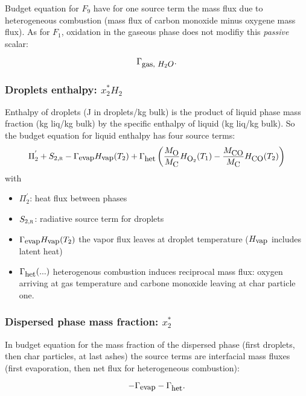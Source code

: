  Budget equation for $F_{9}$ have for one source term the mass flux due to
 heterogeneous combustion (mass flux of carbon monoxide minus oxygene mass
 flux). As for $F_{1}$, oxidation in the gaseous phase does not modifiy this
 {\em passive} scalar:

\begin{equation}
   \Gamma_{\mbox{\small gas, $H_{2}O$}}.
\end{equation}





\subsubsection{Droplets enthalpy: $x_{2}^{*}H_{2}$ }

Enthalpy of droplets (J in droplets/kg bulk) is the product of liquid phase mass
fraction (kg liq/kg bulk) by the specific enthalpy of liquid (kg liq/kg
bulk). So the budget equation for liquid enthalpy has four source terms:
\begin{equation}
     \Pi_{2}^{'}+S_{2,\mbox{\scriptsize\textsc{r}}}-\Gamma_{\mbox{\small evap}}H_{\mbox{\small vap}}(T_{2})
                        +\Gamma_{\mbox{\small het}}\left( \dfrac{M_{\mbox{\small O}}}{M_{\mbox{\small C}}}H_{\mbox{\small O}_{2}}(T_{1})
                                      -\dfrac{M_{\mbox{\small CO}   }}{M_{\mbox{\small C}}}H_{\mbox{\small CO}   }(T_{2})\right)
\end{equation}
with
\begin{itemize}
\item $\Pi_{2}^{'}$: heat flux between phases
\item $S_{2,\mbox{\scriptsize\textsc{r}}}$: radiative source term for droplets
\item $\Gamma_{\mbox{\small evap}}H_{\mbox{\small vap}}(T_{2})$ the vapor flux leaves at droplet temperature ($H_{\mbox{\small vap}}$ includes latent heat)
\item $\Gamma_{\mbox{\small het}}(...)$ heterogenous combustion induces reciprocal mass flux: oxygen arriving at gas temperature and carbone monoxide leaving
at char particle one.
\end{itemize}

\subsubsection{Dispersed phase mass fraction: $x_{2}^{*}$}

In budget equation for the mass fraction of the dispersed phase (first droplets,
then char particles, at last ashes) the source terms are interfacial mass fluxes
(first evaporation, then net flux for heterogeneous combustion):

\begin{equation}
     -\Gamma_{\mbox{\small evap}}-\Gamma_{\mbox{\small het}} .
\end{equation}

\newpage

